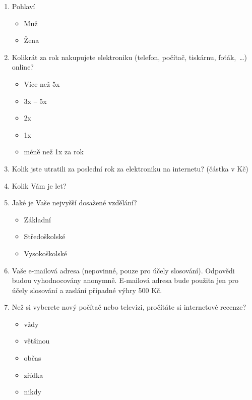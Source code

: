 \documentclass[12pt,twoside,openany]{fithesis}
\begin{document}
\begin{enumerate}

  \item Pohlaví
    \begin{itemize}
       \item Muž
       \item Žena
    \end{itemize}

  \item Kolikrát za rok nakupujete elektroniku (telefon, počítač, tiskárnu, foťák,~\ldots) online?
    \begin{itemize}
       \item Více než 5x
       \item 3x – 5x
       \item 2x
       \item 1x
       \item méně než 1x za rok
    \end{itemize}

  \item Kolik jste utratili za poslední rok za elektroniku na internetu? (částka v Kč)

  \item Kolik Vám je let?

  \item Jaké je Vaše nejvyšší dosažené vzdělání?
    \begin{itemize}
       \item Základní
       \item Středoškolské
       \item Vysokoškolské
    \end{itemize}

  \item Vaše e-mailová adresa (nepovinné, pouze pro účely slosování). 
      Odpovědi budou vyhodnocovány anonymně. 
      E-mailová adresa bude použita jen pro účely slosování a zaslání případné výhry 500 Kč.

  \item Než si vyberete nový počítač nebo televizi, pročítáte si internetové recenze?
    \begin{itemize}
       \item vždy
       \item většinou
       \item občas
       \item zřídka
       \item nikdy
    \end{itemize}


\end{enumerate}
\end{document}
